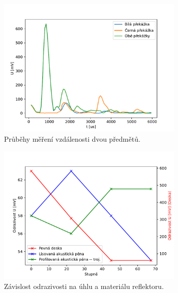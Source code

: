\documentclass{protokol}
\begin{document}

    \begin{figure}[h!]
        \centering
        \includegraphics[width=0.8\textwidth]{img/graf3.pdf}
        \caption{Průběhy měření vzdálenosti dvou předmětů.}
        \label{fig:img/graf-3}
    \end{figure}

    \begin{figure}[h!]
        \centering
        \includegraphics[width=0.8\textwidth]{img/graf4.pdf}
        \caption{Závislost odrazivosti na úhlu a materiálu reflektoru.}
        \label{fig:img/graf-4}
    \end{figure}
\end{document}
